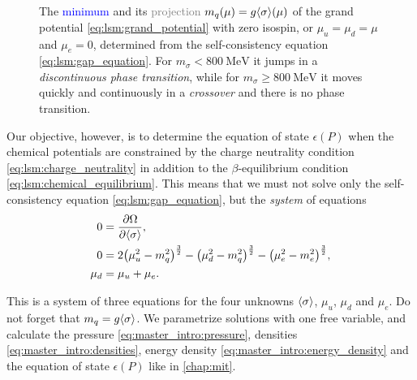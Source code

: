 \begin{figure}[t]
\caption{\label{fig:lsm:grand-potential-noisospin}%
	The \textcolor{blue}{minimum} and its \textcolor{gray}{projection} $m_q(\mu)=g \langle \sigma \rangle(\mu)$ of the grand potential \eqref{eq:lsm:grand_potential} with zero isospin, or $\mu_u = \mu_d = \mu$ and $\mu_e=0$,
	determined from the self-consistency equation \eqref{eq:lsm:gap_equation}.
	For  $m_\sigma <    \SI{800}{\mega\electronvolt}$ it jumps in a \emph{discontinuous phase transition}, while
	for  $m_\sigma \geq \SI{800}{\mega\electronvolt}$ it moves quickly and continuously in a \emph{crossover} and there is no phase transition.
}
\end{figure}

Our objective, however, is to determine the equation of state $\epsilon(P)$
when the chemical potentials are constrained by
the charge neutrality condition \eqref{eq:lsm:charge_neutrality}
in addition to the $\beta$-equilibrium condition \eqref{eq:lsm:chemical_equilibrium}.
This means that we must not solve only the self-consistency equation \eqref{eq:lsm:gap_equation},
but the \emph{system} of equations
\begin{subequations}
\begin{align}
	0 &= \pdv{\Omega}{ \langle \sigma \rangle} , \label{eq:lsm:minsys_min} \\
	0 &= 2 \big(\mu_u^2-m_q^2\big)^\frac32 - \big(\mu_d^2-m_q^2\big)^\frac32 - \big(\mu_e^2-m_e^2\big)^\frac32 , \label{eq:lsm:minsys_charge} \\
	\mu_d &= \mu_u + \mu_e . \label{eq:lsm:minsys_chem}
\end{align}%
\label{eq:lsm:minsys}%
\end{subequations}%

This is a system of three equations for the four unknowns $\langle \sigma \rangle$, $\mu_u$, $\mu_d$ and $\mu_e$.
Do not forget that $m_q = g \langle \sigma \rangle$.
We parametrize solutions with one free variable, 
and calculate the pressure \eqref{eq:master_intro:pressure}, densities \eqref{eq:master_intro:densities}, energy density \eqref{eq:master_intro:energy_density}
and the equation of state $\epsilon(P)$ like in \cref{chap:mit}.

